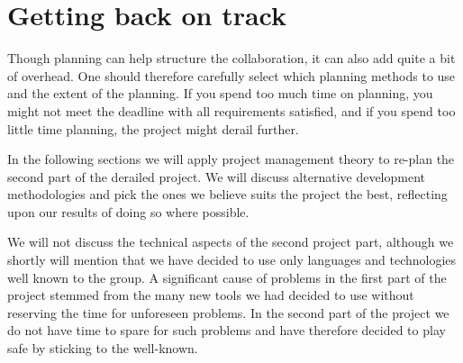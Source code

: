 \section{Getting back on track}
Though planning can help structure the collaboration, it can also add quite a bit of overhead. One should therefore carefully select which planning methods to use and the extent of the planning. If you spend too much time on planning, you might not meet the deadline with all requirements satisfied, and if you spend too little time planning, the project might derail further.

In the following sections we will apply project management theory to re-plan the second part of the derailed project. We will discuss alternative development methodologies and pick the ones we believe suits the project the best, reflecting upon our results of doing so where possible.

We will not discuss the technical aspects of the second project part, although we shortly will mention that we have decided to use only languages and technologies well known to the group.
A significant cause of problems in the first part of the project stemmed from the many new tools we had decided to use without reserving the time for unforeseen problems.
In the second part of the project we do not have time to spare for such problems and have therefore decided to play safe by sticking to the well-known.






\newpage